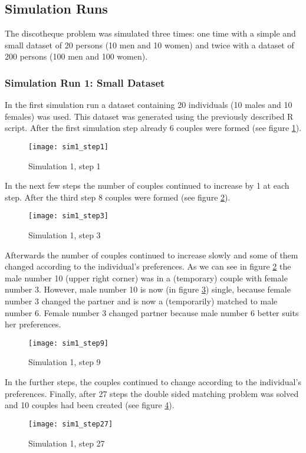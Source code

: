 \clearpage
\subsection{Simulation Runs}
The discotheque problem was simulated three times: one time with a simple and small dataset of 20 persons (10 men and 10 women) and twice with a dataset of 200 persons (100 men and 100 women).

\subsubsection{Simulation Run 1: Small Dataset}
In the first simulation run a dataset containing 20 individuals (10 males and 10 females) was used. 
This dataset was generated using the previously described R script.
After the first simulation step already 6 couples were formed (see figure \ref{fig:sim1_step1}).
\begin{figure}[H]
  \centering
  \texttt{[image: sim1\_step1]}
	\caption{Simulation 1, step 1}
	\label{fig:sim1_step1}
\end{figure}

In the next few steps the number of couples continued to increase by 1 at each step. 
After the third step 8 couples were formed (see figure \ref{fig:sim1_step3}).
\begin{figure}[H]
  \centering
  \texttt{[image: sim1\_step3]}
	\caption{Simulation 1, step 3}
	\label{fig:sim1_step3}
\end{figure}

Afterwards the number of couples continued to increase slowly and some of them changed according to the individual's preferences. 
As we can see in figure \ref{fig:sim1_step3} the male number 10 (upper right corner) was in a (temporary) couple with female number 3. 
However, male number 10 is now (in figure \ref{fig:sim1_step9}) single, because female number 3 changed the partner and is now a (temporarily) matched to male number 6. 
Female number 3 changed partner because male number 6 better suits her preferences.
\begin{figure}[H]
  \centering
  \texttt{[image: sim1\_step9]}
	\caption{Simulation 1, step 9}
	\label{fig:sim1_step9}
\end{figure}

In the further steps, the couples continued to change according to the individual's preferences. 
Finally, after 27 steps the double sided matching problem was solved and 10 couples had been created (see figure \ref{fig:sim1_step27}).
\begin{figure}[H]
  \centering
  \texttt{[image: sim1\_step27]}
	\caption{Simulation 1, step 27}
	\label{fig:sim1_step27}
\end{figure}

